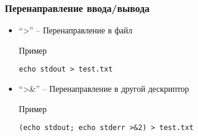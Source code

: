 \begin{frame}[fragile]
	\frametitle{Перенаправление ввода/вывода}

	\begin{itemize}
		\item ``>'' -- Перенаправление в файл
			\begin{block}{Пример}
				\begin{lstlisting}
echo stdout > test.txt
				\end{lstlisting}
			\end{block}
		\item ``>\&'' -- Перенаправление в другой дескриптор
			\begin{block}{Пример}
				\begin{lstlisting}
(echo stdout; echo stderr >&2) > test.txt
				\end{lstlisting}
			\end{block}
	\end{itemize}

\end{frame}
